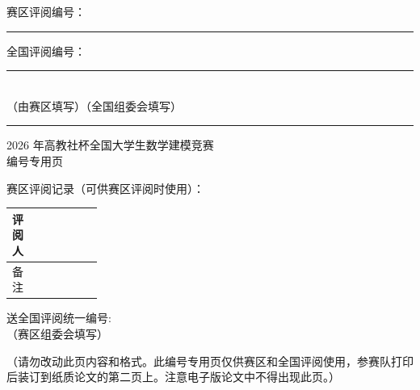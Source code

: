 \thispagestyle{empty}

\noindent 赛区评阅编号：\rule{3.4cm}{0.4pt}\hfill 全国评阅编号：\rule{3.4cm}{0.4pt}\\
{（由赛区填写）}\hfill{（全国组委会填写）}

\vspace{0.25cm}
\hrule
\vspace{0.6cm}

\begin{center}
  {\heiti{} 2026 年高教社杯全国大学生数学建模竞赛}\\[12pt]
  {\heiti{} 编\quad 号\quad 专\quad 用\quad 页}
\end{center}

\vspace{0.6cm}
{
\noindent 赛区评阅记录（可供赛区评阅时使用）：

\vspace{0.2cm}
\begin{center}
\renewcommand{\arraystretch}{1.9}
\begin{tabular}{|c|c|c|c|c|c|c|}
\hline
\makecell{评\\阅\\人} & & & & & & \\[14pt]\hline
\makecell{备\\注} & & & & & & \\[14pt]\hline
\end{tabular}
\end{center}

\vspace{0.7cm}
\noindent 送全国评阅统一编号:\\
（赛区组委会填写）
}

\vfill
{\color{red}（请勿改动此页内容和格式。此编号专用页仅供赛区和全国评阅使用，参赛队打印后装订到纸质论文的第二页上。注意电子版论文中不得出现此页。）}
